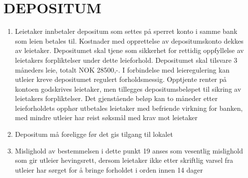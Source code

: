 \section{DEPOSITUM}


    \begin{enumerate}


        \item Leietaker innbetaler depositum som settes på sperret konto i samme bank som leien betales til. Kostnader med opprettelse av depositumskonto dekkes av leietaker. Depositumet skal tjene som sikkerhet for rettidig oppfyllelse av leietakers forpliktelser under dette leieforhold. Depositumet skal tilsvare 3 måneders leie, totalt NOK 28500,-.
        I forbindelse med leieregulering kan utleier kreve depositumet regulert forholdsmessig. Opptjente
        renter på kontoen godskrives leietaker, men tillegges depositumsbeløpet til sikring av leietakers forpliktelser. Det gjenstående beløp kan to måneder
        etter leieforholdets opphør utbetales leietaker med befriende virkning for banken, med mindre utleier har reist søksmål med krav mot leietaker

        \item Depositum må foreligge før det gis tilgang til lokalet

        \item Mislighold av bestemmelsen i dette punkt 19 anses som vesentlig mislighold som gir utleier hevingsrett, dersom leietaker ikke etter skriftlig varsel fra utleier har sørget for å bringe forholdet i orden innen 14 dager


    \end{enumerate}
